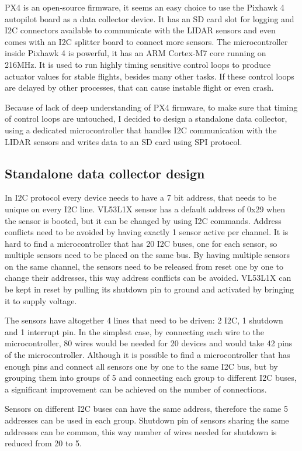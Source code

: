 PX4 is an open-source firmware, it seems an easy choice to use the Pixhawk 4 autopilot board 
as a data collector device. It has an SD card slot for logging and I2C connectors available to
communicate with the LIDAR sensors and even comes with an I2C splitter board to connect more sensors.
The microcontroller inside Pixhawk 4 is powerful, it has an ARM Cortex-M7 core running on 216MHz. 
It is used to run highly timing sensitive control loops to produce actuator values for stable flights,
besides many other tasks. If these control loops are delayed by other processes, that can 
cause instable flight or even crash.

Because of lack of deep understanding of PX4 firmware, to make sure that timing of control loops 
are untouched, I decided to design a standalone data collector, using a dedicated microcontroller that
handles I2C communication with the LIDAR sensors and writes data to an SD card using SPI protocol.

\subsection{Standalone data collector design}
In I2C protocol every device needs to have a 7 bit address, that needs to be unique on every
I2C line. VL53L1X sensor has a default address of 0x29 when the sensor is booted, but it can be changed
by using I2C commands. Address conflicts need to be avoided by having exactly 1 sensor active per channel.
It is hard to find a microcontroller that has 20 I2C buses, one for each sensor, so multiple sensors
need to be placed on the same bus. By having multiple sensors on the same channel, the sensors need to 
be released from reset one by one to change their addresses, this way address conflicts can be avoided.
VL53L1X can be kept in reset by pulling its shutdown pin to ground and activated by bringing it to 
supply voltage. 

The sensors have altogether 4 lines that need to be driven: 2 I2C, 1 shutdown and 1 interrupt pin.
In the simplest case, by connecting each wire to the microcontroller, 80 wires would be needed for 
20 devices and would take 42 pins of the microcontroller. Although it is possible to find a microcontroller 
that has enough pins and connect all sensors one by one to the same I2C bus, but by grouping them 
into groups of 5 and connecting each group to different I2C buses, a significant improvement can be 
achieved on the number of connections. 

Sensors on different I2C buses can have the same address, therefore the same 5 addresses can be used
in each group. Shutdown pin of sensors sharing the same addresses can be common, this way number of
wires needed for shutdown is reduced from 20 to 5.

